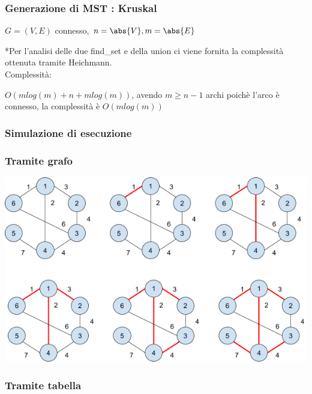\documentclass{article}
\begin{document}
{{\subsubsection{Generazione di MST : Kruskal}

$G=(V,E)$ connesso, $n=\abs{V},m=\abs{E}$



{*Per l'analisi delle due find\_set e della union ci viene fornita la complessità ottenuta tramite Heichmann.\\
}{Complessità}{:}

{$O(mlog(m)+n+mlog(m))$, avendo $m \geq n-1$ archi poichè l'arco è connesso, la complessità è $O(mlog(m))$}

\subsubsection{Simulazione di esecuzione}

\subsubsection{Tramite grafo}

{\includegraphics{images/image519.png}}

\subsubsection{Tramite tabella}

}}
\end{document}
